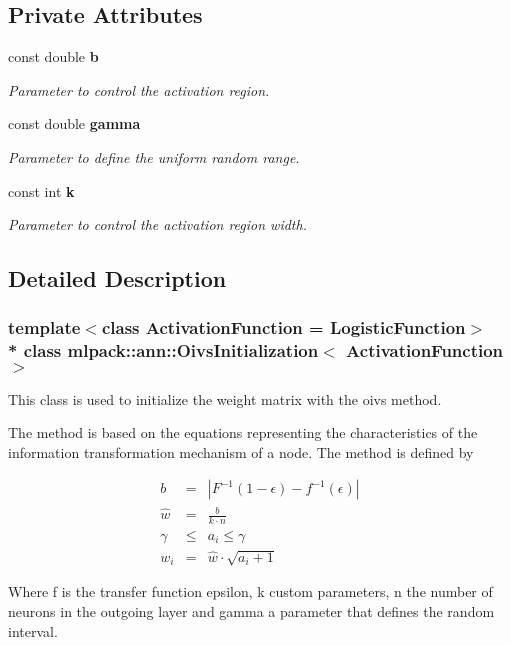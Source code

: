 \subsection*{Private Attributes}
\begin{DoxyCompactItemize}
\item 
const double {\bf b}
\begin{DoxyCompactList}\small\item\em Parameter to control the activation region. \end{DoxyCompactList}\item 
const double {\bf gamma}
\begin{DoxyCompactList}\small\item\em Parameter to define the uniform random range. \end{DoxyCompactList}\item 
const int {\bf k}
\begin{DoxyCompactList}\small\item\em Parameter to control the activation region width. \end{DoxyCompactList}\end{DoxyCompactItemize}


\subsection{Detailed Description}
\subsubsection*{template$<$class Activation\+Function = Logistic\+Function$>$\\*
class mlpack\+::ann\+::\+Oivs\+Initialization$<$ Activation\+Function $>$}

This class is used to initialize the weight matrix with the oivs method. 

The method is based on the equations representing the characteristics of the information transformation mechanism of a node. The method is defined by

\begin{eqnarray*} b &=& |F^{-1}(1 - \epsilon) - f^{-1}(\epsilon)| \\ \hat{w} &=& \frac{b}{k \cdot n} \\ \gamma &\le& a_i \le \gamma \\ w_i &=& \hat{w} \cdot \sqrt{a_i + 1} \end{eqnarray*}

Where f is the transfer function epsilon, k custom parameters, n the number of neurons in the outgoing layer and gamma a parameter that defines the random interval.



